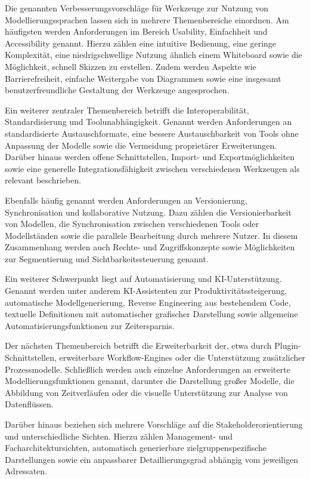 Die genannten Verbesserungsvorschläge für Werkzeuge zur Nutzung von Modellierungssprachen lassen sich in mehrere Themenbereiche einordnen. Am häufigsten werden Anforderungen im Bereich Usability, Einfachheit und Accessibility genannt. Hierzu zählen eine intuitive Bedienung, eine geringe Komplexität, eine niedrigschwellige Nutzung ähnlich einem Whiteboard sowie die Möglichkeit, schnell Skizzen zu erstellen. Zudem werden Aspekte wie Barrierefreiheit, einfache Weitergabe von Diagrammen sowie eine insgesamt benutzerfreundliche Gestaltung der Werkzeuge angesprochen.

Ein weiterer zentraler Themenbereich betrifft die Interoperabilität, Standardisierung und Toolunabhängigkeit. Genannt werden Anforderungen an standardisierte Austauschformate, eine bessere Austauschbarkeit von Tools ohne Anpassung der Modelle sowie die Vermeidung proprietärer Erweiterungen. Darüber hinaus werden offene Schnittstellen, Import- und Exportmöglichkeiten sowie eine generelle Integrationsfähigkeit zwischen verschiedenen Werkzeugen als relevant beschrieben.

Ebenfalls häufig genannt werden Anforderungen an Versionierung, Synchronisation und kollaborative Nutzung. Dazu zählen die Versionierbarkeit von Modellen, die Synchronisation zwischen verschiedenen Tools oder Modellständen sowie die parallele Bearbeitung durch mehrere Nutzer. In diesem Zusammenhang werden auch Rechte- und Zugriffskonzepte sowie Möglichkeiten zur Segmentierung und Sichtbarkeitssteuerung genannt.

Ein weiterer Schwerpunkt liegt auf Automatisierung und KI-Unterstützung. Genannt werden unter anderem KI-Assistenten zur Produktivitätssteigerung, automatische Modellgenerierung, Reverse Engineering aus bestehendem Code, textuelle Definitionen mit automatischer grafischer Darstellung sowie allgemeine Automatisierungsfunktionen zur Zeitersparnis.

Der nächsten Themenbereich betrifft die Erweiterbarkeit der, etwa durch Plugin-Schnittstellen, erweiterbare Workflow-Engines oder die Unterstützung zusätzlicher Prozessmodelle.
Schließlich werden auch einzelne Anforderungen an erweiterte Modellierungsfunktionen genannt, darunter die Darstellung großer Modelle, die Abbildung von Zeitverläufen oder die visuelle Unterstützung zur Analyse von Datenflüssen.


Darüber hinaus beziehen sich mehrere Vorschläge auf die Stakeholderorientierung und unterschiedliche Sichten. Hierzu zählen Management- und Facharchitektursichten, automatisch generierbare zielgruppenspezifische Darstellungen sowie ein anpassbarer Detaillierungsgrad abhängig vom jeweiligen Adressaten.


